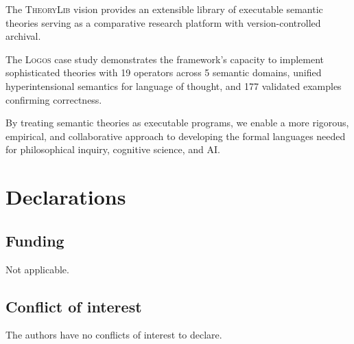 \documentclass[pdflatex,sn-mathphys-num]{sn-jnl}
\newcommand{\theorylogos}{\textsc{Logos}}
\newcommand{\theorylib}{\textsc{TheoryLib}}
\theoremstyle{thmstyleone}
\theoremstyle{thmstyletwo}
\theoremstyle{thmstylethree}
\begin{document}
The \theorylib{} vision provides an extensible library of executable semantic theories serving as a comparative research platform with version-controlled archival.

The \theorylogos{} case study demonstrates the framework's capacity to implement sophisticated theories with 19 operators across 5 semantic domains, unified hyperintensional semantics for language of thought, and 177 validated examples confirming correctness.

By treating semantic theories as executable programs, we enable a more rigorous, empirical, and collaborative approach to developing the formal languages needed for philosophical inquiry, cognitive science, and AI.


\backmatter






\section*{Declarations}

\subsection*{Funding}
Not applicable.

\subsection*{Conflict of interest}
The authors have no conflicts of interest to declare.
\end{document}
